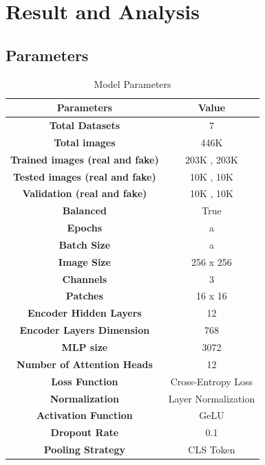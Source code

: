 \section{Result and Analysis}
\subsection{Parameters}
\begin{table}[h]
    \centering
    \renewcommand{\arraystretch}{1.5} %
    \begin{tabular}{|c|c|}
        \hline
        \textbf{Parameters} & \textbf{Value} \\
        \hline
        \textbf{Total Datasets} & 7  \\
        \hline
        \textbf{Total images} & 446K  \\
        \hline
        \textbf{Trained images (real and fake)} & 203K , 203K \\
        \hline
        \textbf{Tested images (real and fake)} & 10K , 10K \\
        \hline
        \textbf{Validation (real and fake)} & 10K , 10K \\
        \hline
        \textbf{Balanced} &  True\\
        \hline
        \textbf{Epochs} &  a\\
        \hline
        \textbf{Batch Size} &  a\\
        \hline
        \textbf{Image Size} &  256 x 256\\
        \hline
        \textbf{Channels} &  3\\
        \hline
        \textbf{Patches} & 16 x 16\\
        \hline
        \textbf{Encoder Hidden Layers} & 12\\
        \hline
        \textbf{Encoder Layers Dimension} & 768\\
        \hline
        \textbf{MLP size} & 3072\\
        \hline
        \textbf{ Number of Attention Heads } & 12\\
        \hline
        
        \textbf{Loss Function} & Cross-Entropy Loss \\
        \hline
        \textbf{Normalization} & Layer Normalization \\
        \hline
        \textbf{Activation Function} & GeLU \\
        \hline
        \textbf{Dropout Rate } & 0.1  \\
        \hline
        \textbf{Pooling Strategy } & CLS Token \\
        \hline
    \end{tabular}
    \caption{Model Parameters}
    \label{tab:model-parameters}
\end{table}
